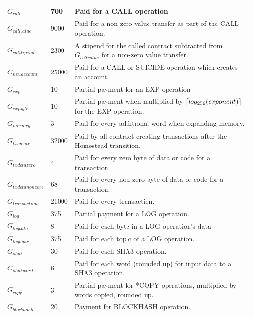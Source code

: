 \documentclass{article}
\DeclarePairedDelimiter{\ceil}{\lceil}{\rceil}
\begin{document}
\begin{table}[!ht]
\begin{tabular}{| l | l | p{8cm} |}
			$G_{call}$ 			& 700		& Paid for a CALL operation. \\ \hline
			$G_{callvalue}$ 	& 9000		& Paid for a non-zero value transfer as part of the CALL operation. \\ \hline
			$G_{calstipend}$ 	& 2300		& A stipend for the called contract subtracted from $G_{callvalue}$ for a non-zero value transfer. \\ \hline
			$G_{newaccount}$ 	& 25000		& Paid for a CALL or SUICIDE operation which creates an account. \\ \hline
			$G_{exp}$ 			& 10 		& Partial payment for an EXP operation \\ \hline
			$G_{expbyte}$ 		& 10		& Partial payment when multiplied by $\ceil{log_{256}(exponent)}$  for the EXP operation. 	 \\ \hline
			$G_{memory}$ 		& 3			& Paid for every additional word when expanding memory. \\ \hline
			$G_{txcreate}$ 		& 32000		& Paid by all contract-creating transactions after the Homestead transition. \\ \hline
			$G_{txdatazero}$ 	& 4 		& Paid for every zero byte of data or code for a transaction. \\ \hline
			$G_{txdatanonzero}$ & 68		& Paid for every non-zero byte of data or code for a transaction. \\ \hline
			$G_{transaction}$ 	& 21000		& Paid for every transaction. \\ \hline
			$G_{log}$ 			& 375 		& Partial payment for a LOG operation. \\ \hline
			$G_{logdata}$ 		& 8			& Paid for each byte in a LOG operation's data. \\ \hline
			$G_{logtopic}$ 		& 375		& Paid for each topic of a LOG operation. \\ \hline
			$G_{sha3}$ 			& 30		& Paid for each SHA3 operation. \\ \hline
			$G_{sha3word}$ 		& 6			& Paid for each word (rounded up) for input data to a SHA3 operation. \\ \hline
			$G_{copy}$ 			& 3			& Partial payment for *COPY operations, multiplied by words copied, rounded up. \\ \hline
			$G_{blockhash}$ 	& 20		& Payment for BLOCKHASH operation. \\ 
			\hline
		\end{tabular}
		\end{table}
		\FloatBarrier
\end{document}
